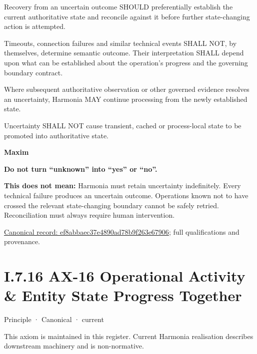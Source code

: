 Recovery from an uncertain outcome SHOULD preferentially establish the current authoritative state and reconcile against it before further state-changing action is attempted.



Timeouts, connection failures and similar technical events SHALL NOT, by themselves, determine semantic outcome. Their interpretation SHALL depend upon what can be established about the operation's progress and the governing boundary contract.



Where subsequent authoritative observation or other governed evidence resolves an uncertainty, Harmonia MAY continue processing from the newly established state.



Uncertainty SHALL NOT cause transient, cached or process-local state to be promoted into authoritative state.



\par\medskip\textbf{Maxim}\par


\textbf{Do not turn “unknown” into “yes” or “no”.}



\textbf{This does not mean:} Harmonia must retain uncertainty indefinitely. Every technical failure produces an uncertain outcome. Operations known not to have crossed the relevant state-changing boundary cannot be safely retried. Reconciliation must always require human intervention.


{\footnotesize \href{../../../../../../../../continuum/motivation/principle/ef8abbaec37e4890ad78b9f263e67906.md}{Canonical record: ef8abbaec37e4890ad78b9f263e67906}; full qualifications and provenance.}\par
\section*{I.7.16 AX-16 Operational Activity \& Entity State Progress Together}
\label{navigation:I.7.16}

\label{element:de7e90f46127455a9ec9ad3b9b48ba54}
{\small Principle · Canonical · current}\par

This axiom is maintained in this register. Current Harmonia realisation describes downstream machinery and is non-normative.



